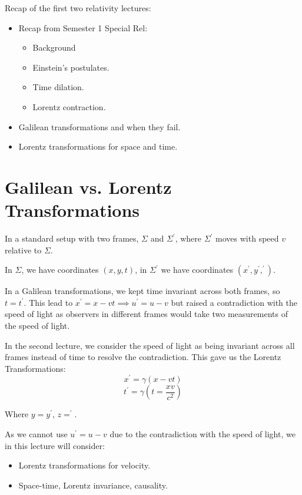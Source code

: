 
Recap of the first two relativity lectures:
\begin{itemize}
    \item Recap from Semester 1 Special Rel:
    \begin{itemize}
        \item Background
        \item Einstein's postulates.
        \item Time dilation.
        \item Lorentz contraction.
    \end{itemize}
    \item Galilean transformations and when they fail.
    \item Lorentz transformations for space and time.
\end{itemize}

\section{Galilean vs. Lorentz Transformations}
In a standard setup with two frames, $\Sigma$ and $\Sigma^\prime$, where $\Sigma^\prime$ moves with speed $v$ relative to $\Sigma$.

In $\Sigma$, we have coordinates $(x, y, t)$, in $\Sigma^\prime$ we have coordinates $(x^\prime, y^\prime, ^\prime)$.

In a Galilean transformations, we kept time invariant across both frames, so $t = t^\prime$. This lead to $x^\prime = x - vt \implies u^\prime = u - v$ but raised a contradiction with the speed of light as observers in different frames would take two measurements of the speed of light.

In the second lecture, we consider the speed of light as being invariant across all frames instead of time to resolve the contradiction. This gave us the Lorentz Transformations:
\[
    x^\prime = \gamma(x - vt)
\]
\[
    t^\prime = \gamma \left( t = \frac{xv}{c^2}\right)
\]

Where $y = y^\prime$, $z=^\prime$.

As we cannot use $u^\prime = u - v$ due to the contradiction with the speed of light, we in this lecture will consider:
\begin{itemize}
    \item Lorentz transformations for velocity.
    \item Space-time, Lorentz invariance, causality.
\end{itemize}

